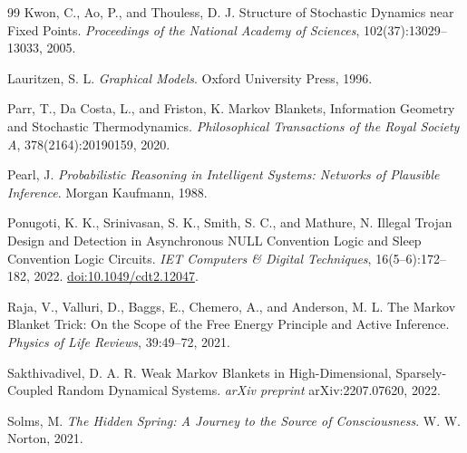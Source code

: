 \documentclass[11pt]{article}
\theoremstyle{definition}
\begin{document}
\begin{thebibliography}{99}
 Kwon, C., Ao, P., and Thouless, D. J. Structure of Stochastic Dynamics near Fixed Points. \emph{Proceedings of the National Academy of Sciences}, 102(37):13029--13033, 2005.

 Lauritzen, S. L. \emph{Graphical Models}. Oxford University Press, 1996.

 Parr, T., Da Costa, L., and Friston, K. Markov Blankets, Information Geometry and Stochastic Thermodynamics. \emph{Philosophical Transactions of the Royal Society A}, 378(2164):20190159, 2020.

 Pearl, J. \emph{Probabilistic Reasoning in Intelligent Systems: Networks of Plausible Inference}. Morgan Kaufmann, 1988.

 Ponugoti, K. K., Srinivasan, S. K., Smith, S. C., and Mathure, N. Illegal Trojan Design and Detection in Asynchronous NULL Convention Logic and Sleep Convention Logic Circuits. \emph{IET Computers \& Digital Techniques}, 16(5--6):172--182, 2022. \href{https://doi.org/10.1049/cdt2.12047}{doi:10.1049/cdt2.12047}.

 Raja, V., Valluri, D., Baggs, E., Chemero, A., and Anderson, M. L. The Markov Blanket Trick: On the Scope of the Free Energy Principle and Active Inference. \emph{Physics of Life Reviews}, 39:49--72, 2021.

 Sakthivadivel, D. A. R. Weak Markov Blankets in High-Dimensional, Sparsely-Coupled Random Dynamical Systems. \emph{arXiv preprint} arXiv:2207.07620, 2022.

 Solms, M. \emph{The Hidden Spring: A Journey to the Source of Consciousness}. W. W. Norton, 2021.

\end{thebibliography}
\end{document}
